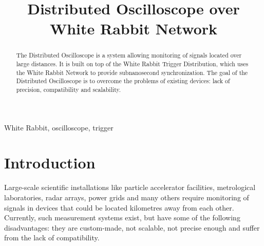 \documentclass[conference]{IEEEtran}
\begin{document}
\title{Distributed Oscilloscope over White Rabbit Network\\
}

\author{

\and
{}
}

\maketitle

\begin{abstract}
The Distributed Oscilloscope is a system allowing monitoring of signals located over large distances. It is built on top of the White Rabbit Trigger Distribution, which uses the White Rabbit Network to provide subnanosecond synchronization. The goal of the Distributed Oscilloscope is to overcome the problems of existing devices: lack of precision, compatibility and scalability.  


\end{abstract}

\begin{IEEEkeywords}
White Rabbit, oscilloscope, trigger
\end{IEEEkeywords}

\section{Introduction}

Large-scale scientific installations like particle accelerator facilities, metrological laboratories, radar arrays, power grids and many others require monitoring of signals in devices that could be located kilometres away from each other. Currently, such measurement systems exist, but have some of the following disadvantages: they are custom-made, not scalable, not precise enough and suffer from the lack of compatibility.
\end{document}
